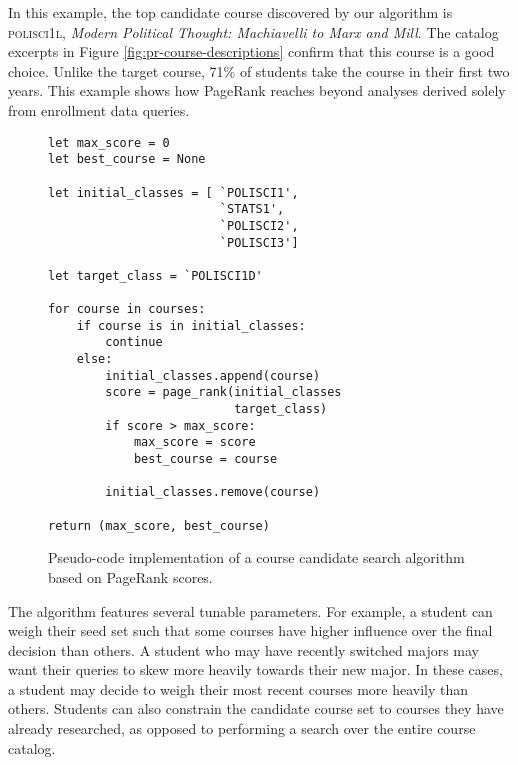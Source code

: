 In this example, the top candidate course discovered by our algorithm
is \textsc{polisci1l}, {\em Modern Political Thought: Machiavelli to Marx
  and Mill}. The catalog excerpts in Figure
\ref{fig:pr-course-descriptions} confirm that this course is a good
choice. Unlike the target course, 71\% of students take the course in
their first two years. This example shows how PageRank reaches beyond
analyses derived solely from enrollment data queries.


\lstset{language=Python}          %

\begin{figure}
    \begin{verbatim}
let max_score = 0
let best_course = None 

let initial_classes = [ `POLISCI1',
                        `STATS1',
                        `POLISCI2',
                        `POLISCI3']
                        
let target_class = `POLISCI1D'

for course in courses:
    if course is in initial_classes:
        continue
    else:
        initial_classes.append(course)
        score = page_rank(initial_classes
                          target_class)
        if score > max_score:
            max_score = score
            best_course = course
        
        initial_classes.remove(course)

return (max_score, best_course)

\end{verbatim}
\caption{Pseudo-code implementation of a course candidate search algorithm based on PageRank scores.}
\label{fig:course-recommendation-algorithm}
\end{figure}

The algorithm features several tunable parameters. For example, a
student can weigh their seed set such that some courses have higher
influence over the final decision than others. A student who may have
recently switched majors may want their queries to skew more heavily
towards their new major. In these cases, a student may decide to weigh
their most recent courses more heavily than others. Students can also
constrain the candidate course set to courses they have already
researched, as opposed to performing a search over the entire course
catalog.
